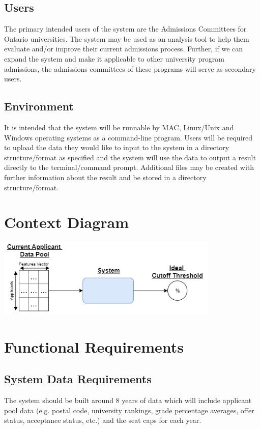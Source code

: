 \documentclass{article}
\begin{document}
\begin{normalsize}
        \subsection{Users}
        The primary intended users of the system are the Admissions Committees for Ontario universities. The system may be used as an analysis tool to help them evaluate and/or improve their current admissions process. Further, if we can expand the system and make it applicable to other university program admissions, the admissions committees of these programs will serve as secondary users.

        \subsection {Environment}
        It is intended that the system will be runnable by MAC, Linux/Unix and Windows operating systems as a command-line program. Users will be required to upload the data they would like to input to the system in a directory structure/format as specified and the system will use the data to output a result directly to the terminal/command prompt. Additional files may be created with further information about the result and be stored in a directory structure/format.
   
    \section{Context Diagram}
   \begin{center}
        \includegraphics[width=300pt]{images/simpleDiagram}
   \end{center}
   
	\section{Functional Requirements}
	    \subsection{System Data Requirements}
	        The system should be built around 8 years of data which will include applicant pool data (e.g. postal code, university rankings, grade percentage averages, offer status, acceptance status, etc.) and the seat caps for each year.

\end{normalsize}
\end{document}
